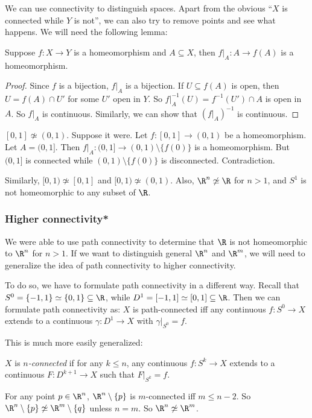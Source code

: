 \documentclass[a4paper]{article}
\begin{document}
We can use connectivity to distinguish spaces. Apart from the obvious ``$X$ is connected while $Y$ is not'', we can also try to remove points and see what happens. We will need the following lemma:
\begin{lemma}
  Suppose $f: X\to Y$ is a homeomorphism and $A\subseteq X$, then $f|_A: A\to f(A)$ is a homeomorphism.
\end{lemma}

\begin{proof}
  Since $f$ is a bijection, $f|_A$ is a bijection. If $U\subseteq f(A)$ is open, then $U = f(A) \cap U'$ for some $U'$ open in $Y$. So $f|_A^{-1}(U) = f^{-1}(U')\cap A$ is open in $A$. So $f|_A$ is continuous. Similarly, we can show that $(f|_A)^{-1}$ is continuous.
\end{proof}

\begin{eg} $[0, 1] \not\simeq (0, 1)$. Suppose it were. Let $f: [0, 1]\to (0,1)$ be a homeomorphism. Let $A = (0, 1]$. Then $f|_A: (0, 1] \to (0, 1)\setminus\{f(0)\}$ is a homeomorphism. But $(0, 1]$ is connected while $(0, 1)\setminus \{f(0)\}$ is disconnected. Contradiction.

Similarly, $[0, 1)\not\simeq [0, 1]$ and $[0, 1)\not\simeq (0, 1)$. Also, $\R^n\not \simeq \R$ for $n > 1$, and $S^1$ is not homeomorphic to any subset of $\R$.
\end{eg}

\subsubsection{Higher connectivity*}
We were able to use path connectivity to determine that $\R$ is not homeomorphic to $\R^n$ for $n > 1$. If we want to distinguish general $\R^n$ and $\R^m$, we will need to generalize the idea of path connectivity to higher connectivity.

To do so, we have to formulate path connectivity in a different way. Recall that $S^0 = \{-1, 1\} \simeq \{0, 1\}\subseteq \R$, while $D^1 = [-1, 1] \simeq [0, 1] \subseteq \R$. Then we can formulate path connectivity as: $X$ is path-connected iff any continuous $f: S^0\to X$ extends to a continuous $\gamma: D^1 \to X$ with $\gamma|_{S^0} = f$.

This is much more easily generalized:
\begin{defi}[$n$-connectedness]
  $X$ is $n$\emph{-connected} if for any $k \leq n$, any continuous $f: S^k \to X$ extends to a continuous $F: D^{k + 1}\to X$ such that $F|_{S^k} = f$.
\end{defi}
For any point $p\in \R^n$, $\R^n \setminus \{p\}$ is $m$-connected iff $m \leq n - 2$. So $\R^n\setminus\{p\} \not\simeq \R^m\setminus\{q\}$ unless $n = m$. So $\R^n \not\simeq \R^m$.
\end{document}
